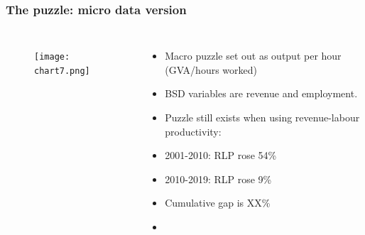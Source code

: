 \documentclass{beamer}
\begin{document}
\begin{frame}
\frametitle{The puzzle: micro data version}

\begin{columns}


\begin{figure}
\centering
\texttt{[image: chart7.png]}
\end{figure}


\begin{itemize}
\item Macro puzzle set out as output per hour (GVA/hours worked)
\item BSD variables are revenue and employment.
\item Puzzle still exists when using revenue-labour productivity:
    \item 2001-2010: RLP rose 54\%
    \item 2010-2019: RLP rose 9\%
\item Cumulative gap is XX\%
\item \href{https://www.rapidcharts.io/productivity}{}
\end{itemize}



\end{columns}
\end{frame}
\end{document}
